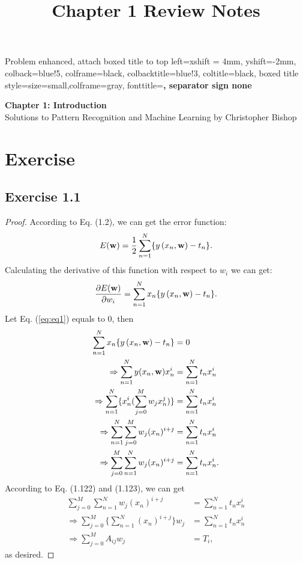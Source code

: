 \documentclass[11pt]{article}
\theoremstyle{definition}
\begin{document}
\setcounter{section}{0}
\title{Chapter 1 Review Notes}

\thispagestyle{empty}


              {Problem}%
  {enhanced, %
  attach boxed title to top left={xshift = 4mm, yshift=-2mm},
  colback=blue!5, colframe=black, colbacktitle=blue!3, coltitle=black,
  boxed title style={size=small,colframe=gray},
  fonttitle=\bfseries,
  separator sign none
  }%
  {} 
\newenvironment{problem}[1]{\begin{prob*}{#1}{}}{\end{prob*}}

\begin{center}
{\LARGE \bf Chapter 1: Introduction}\\
{\large Solutions to Pattern Recognition and Machine Learning by Christopher Bishop}\\
\end{center}

\tableofcontents
\newpage
\setcounter{secnumdepth}{1}
\section{Exercise}
\subsection{Exercise 1.1}
\begin{proof}
According to Eq. (1.2), we can get the error function:
\begin{equation*}
E(\bold{w}) = \frac{1}{2}\sum^{N}_{n=1} \{ y\left(x_n,\bold{w}\right) - t_n \}.
\end{equation*}
Calculating the derivative of this function with respect to $w_i$ we can get:
\begin{align}
 \frac{\partial E(\bold{w})}{\partial w_i} = \sum^{N}_{n=1}x_n\{y\left(x_n,\bold{w}\right) - t_n\}.  \label{eq:eq1} 
\end{align}
Let Eq. (\ref{eq:eq1}) equals to 0, then
\begin{align*}
\sum^{N}_{n=1}x_n\{y\left(x_n,\bold{w}\right) - t_n\} &= 0 \\
\Rightarrow\sum^N_{n=1}y(x_n,\bold{w})x_n^i &= \sum^N_{n=1}t_nx_n^i \\
\Rightarrow\sum^N_{n=1}\{x_n^i(\sum^M_{j=0}w_jx_n^j)\} &= \sum^N_{n=1}t_nx_n^i \\
\Rightarrow\sum^N_{n=1}\sum^M_{j=0}w_j(x_n)^{i+j} &= \sum^N_{n=1}t_nx_n^i \\
\Rightarrow\sum^M_{j=0}\sum^N_{n=1}w_j(x_n)^{i+j} &= \sum^N_{n=1}t_nx_n^i.
\end{align*}
According to Eq. (1.122) and (1.123), we can get
\begin{align*}
\sum^M_{j=0}\sum^N_{n=1}w_j(x_n)^{i+j} &= \sum^N_{n=1}t_nx_n^i \\
\Rightarrow\sum^M_{j=0}\{\sum^N_{n=1}(x_n)^{i+j}\}w_j &= \sum^N_{n=1}t_nx_n^i \\
\Rightarrow\sum^M_{j=0}A_{ij}w_j &= T_i,
\end{align*}
as desired.
\end{proof}
\end{document}
